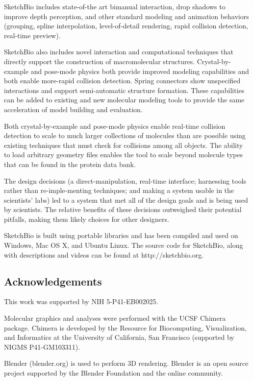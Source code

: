 \documentclass[twocolumn]{bmcart}%
\begin{document}
SketchBio includes state-of-the art bimanual interaction, drop shadows to improve depth perception, and other standard modeling and animation behaviors (grouping, spline interpolation, level-of-detail rendering, rapid collision detection, real-time preview).

SketchBio also includes novel interaction and computational techniques that directly support the construction of macromolecular structures.
Crystal-by-example and pose-mode physics both provide improved modeling capabilities and both enable more-rapid collision detection.
Spring connectors show unspecified interactions and support semi-automatic structure formation.
These capabilities can be added to existing and new molecular modeling tools to provide the same acceleration of model building and evaluation.

Both crystal-by-example and pose-mode physics enable real-time collision detection to scale to much larger collections of molecules than are possible using existing techniques that must check for collisions among all objects. The ability to load arbitrary geometry files enables the tool to scale beyond molecule types that can be found in the protein data bank.

The design decisions (a direct-manipulation, real-time interface; harnessing tools rather than re-imple-menting techniques; and making a system usable in the scientists' labs) led to a system that met all of the design goals and is being used by scientists.
The relative benefits of these decisions outweighed their potential pitfalls, making them likely choices for other designers.

SketchBio is built using portable libraries and has been compiled and used on Windows, Mac OS X, and Ubuntu Linux.
The source code for SketchBio, along with descriptions and videos can be found at http://sketchbio.org.

\subsection*{Acknowledgements}
This work was supported by NIH 5-P41-EB002025.

Molecular graphics and analyses were performed with the UCSF Chimera package.
Chimera is developed by the Resource for Biocomputing, Visualization, and Informatics at the University of California, San Francisco (supported by NIGMS P41-GM103311).

Blender (blender.org) is used to perform 3D rendering.
Blender is an open source project supported by the Blender Foundation and the online community.
\end{document}
